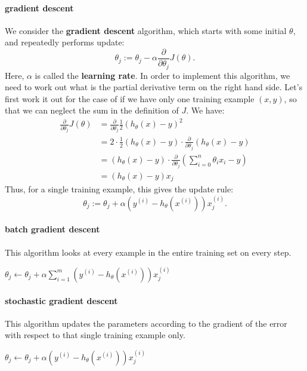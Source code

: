 \documentclass{article}
\begin{document}
\paragraph{gradient descent} We consider the {\bf gradient descent} algorithm, which starts with some initial $\theta$, and repeatedly performs update:
\begin{equation}
	\theta_j := \theta_j - \alpha\frac{\partial}{\partial \theta_j}J(\theta).
\end{equation}
Here, $\alpha$ is called the {\bf learning rate}.
In order to implement this algorithm, we need to work out what is the partial derivative term on the right hand side. Let's first work it out for the case of if we have only one training example $(x,y)$, so that we can neglect the sum in the definition of $J$. We have:
\begin{align*}
	\frac{\partial}{\partial\theta_j}J(\theta) &= \frac{\partial}{\partial\theta_j}\frac{1}{2}(h_\theta(x)-y)^2 \\
	&= 2\cdot\frac{1}{2}(h_\theta(x)-y)\cdot\frac{\partial}{\partial\theta_j}(h_\theta(x)-y)\\
	&= (h_\theta(x)-y)\cdot\frac{\partial}{\partial\theta_j}\left(\sum_{i=0}^{n}\theta_ix_i-y\right) \\
	&= (h_\theta(x)-y)x_j
\end{align*}
Thus, for a single training example, this gives the update rule:
\begin{equation}
	\label{eq:update_rule}
	\theta_j := \theta_j + \alpha\left(y^{(i)}-h_\theta(x^{(i)})\right)x_j^{(i)}.
\end{equation}
\paragraph{batch gradient descent} This algorithm looks at every example in the entire training set on every step.
\begin{algorithmic}
\Repeat
	\State $\theta_j \gets \theta_j + \alpha \sum_{i=1}^{m}\left(y^{(i)} - h_\theta(x^{(i)})\right)x_j^{(i)}$
\end{algorithmic}
\paragraph{stochastic gradient descent} This algorithm updates the parameters according to the gradient of the error with respect to that single training example only.
\begin{algorithmic}
\Loop
		\State $\theta_j \gets \theta_j + \alpha \left(y^{(i)} - h_\theta(x^{(i)})\right)x_j^{(i)}$
	\EndFor
\EndLoop
\end{algorithmic}
\end{document}
